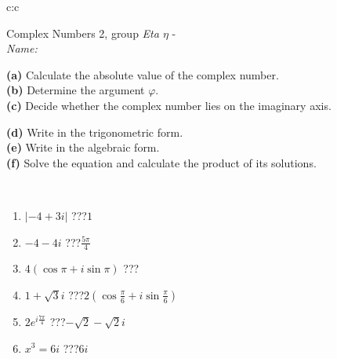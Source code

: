 \documentclass[10pt]{report}
\begin{document}
\newpage
\thispagestyle{empty}
\begin{tabular}{c:c}
\begin{minipage}[c][104.5mm][t]{0.5\linewidth}
\begin{center}
\vspace{5mm}
{\huge Complex Numbers 2, group \textit{Eta $\eta$} -}\\[5mm]
\textit{Name:}\phantom{xxxxxxxxxxxxxxxxxxxxxxxxxxxxxxxxxxxxxxxxxxxxxxxxxxxxxxxxxxxxxxxxx}\\[5mm]
\begin{minipage}{0.95\linewidth}
\begin{center}
{\small \begin{minipage}{0.44\textwidth} \raggedright
\textbf{(a)} Calculate the absolute value of the complex number. \\[1mm]
\textbf{(b)} Determine the argument \(\varphi\). \\[1mm]
\textbf{(c)} Decide whether the complex number lies on the imaginary axis. \end{minipage} \begin{minipage}{0.54\textwidth}
\textbf{(d)} Write in the trigonometric form. \\[1mm]
\textbf{(e)} Write in the algebraic form. \\[1mm]
\textbf{(f)} Solve the equation and calculate the product of its solutions.
\end{minipage}
}
\end{center}
\end{minipage}
\\[1mm]
\begin{minipage}{0.79\linewidth}
\begin{center}
\begin{varwidth}{\linewidth}
\setlength{\itemsep}{0pt}
\begin{enumerate}
\large
\item $|-4+3i|$\quad \dotfill\; ???\;\dotfill \quad $1$
\item $-4-4i$\quad \dotfill\; ???\;\dotfill \quad $\frac{5\pi}{4}$
\item $4\left(\cos{\pi}+i\sin{\pi}\right)$\quad \dotfill\; ???\;\dotfill \quad {}
\item $1+\sqrt{3}i$\quad \dotfill\; ???\;\dotfill \quad $2\left(\cos{\frac{\pi}{6}}+i\sin{\frac{\pi}{6}}\right)$
\item $2e^{i\frac{7\pi}{4}}$\quad \dotfill\; ???\;\dotfill \quad $-\sqrt{2}-\sqrt{2}i$
\item $x^3=6i$\quad \dotfill\; ???\;\dotfill \quad $6i$

\end{enumerate}
\end{varwidth}
\end{center}
\end{minipage}
\end{center}
\end{minipage}
\end{tabular}
\end{document}

